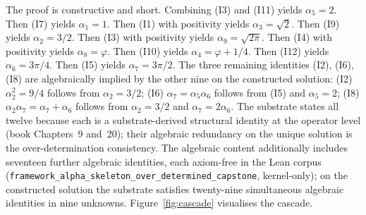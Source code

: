 \documentclass[11pt,a4paper]{amsart}
\theoremstyle{plain}
\theoremstyle{definition}
\begin{document}
The proof is constructive and short. Combining (I3) and (I11) yields $\alpha_5 = 2$. Then (I7) yields $\alpha_1 = 1$. Then (I1) with positivity yields $\alpha_3 = \sqrt{2}$. Then (I9) yields $\alpha_2 = 3/2$. Then (I3) with positivity yields $\alpha_9 = \sqrt{2\pi}$. Then (I4) with positivity yields $\alpha_8 = \varphi$. Then (I10) yields $\alpha_4 = \varphi + 1/4$. Then (I12) yields $\alpha_6 = 3\pi/4$. Then (I5) yields $\alpha_7 = 3\pi/2$. The three remaining identities (I2), (I6), (I8) are algebraically implied by the other nine on the constructed solution: (I2) $\alpha_2^2 = 9/4$ follows from $\alpha_2 = 3/2$; (I6) $\alpha_7 = \alpha_5\alpha_6$ follows from (I5) and $\alpha_5 = 2$; (I8) $\alpha_2\alpha_7 = \alpha_7 + \alpha_6$ follows from $\alpha_2 = 3/2$ and $\alpha_7 = 2\alpha_6$. The substrate states all twelve because each is a substrate-derived structural identity at the operator level (book Chapters~9 and~20); their algebraic redundancy on the unique solution is the over-determination consistency. The algebraic content additionally includes seventeen further algebraic identities, each axiom-free in the Lean corpus (\texttt{framework\_alpha\_skeleton\_over\_determined\_capstone}, kernel-only); on the constructed solution the substrate satisfies twenty-nine simultaneous algebraic identities in nine unknowns. Figure~\ref{fig:cascade} visualises the cascade.
\end{document}

